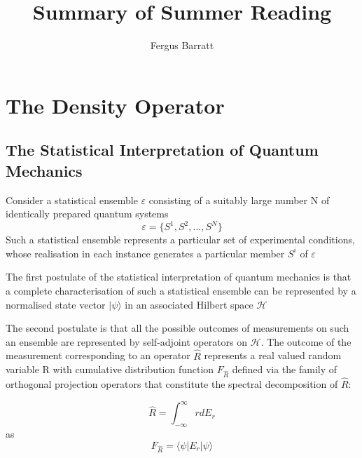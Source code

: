 \documentclass[reqno]{amsart}
\title{Summary of Summer Reading}
\author{Fergus Barratt}
\begin{document}
\maketitle

 

\section{The Density Operator}
\subsection{The Statistical Interpretation of Quantum Mechanics}
\autocite{Breuer2002}
Consider a statistical ensemble $\varepsilon$ consisting of a suitably large number N of identically prepared quantum systems
\begin{equation}
	\varepsilon = \{S^1, S^2, ..., S^N\}
\end{equation}
Such a statistical ensemble represents a particular set of experimental conditions, whose realisation in each instance generates a particular member $S^i$ of  $\varepsilon$

The first postulate of the statistical interpretation of quantum mechanics is that a complete characterisation of such a statistical ensemble can be represented by a normalised state vector $| \psi \rangle$ in an associated Hilbert space $\mathcal{H}$

The second postulate is that all the possible outcomes of measurements on such an ensemble are represented by self-adjoint operators on $\mathcal{H}$. The outcome of the measurement corresponding to an operator $\hat{R}$ represents a real valued random variable R with cumulative distribution function $F_{\hat{R}}$ defined via the family of orthogonal projection operators that constitute the spectral decomposition of $\hat{R}$:

\begin{equation}
	\hat{R} = \int_{-\infty}^\infty rdE_r
\end{equation}
as
\begin{equation}
	F_{\hat{R}} = \langle \psi |E_r | \psi \rangle
\end{equation}
\end{document}

